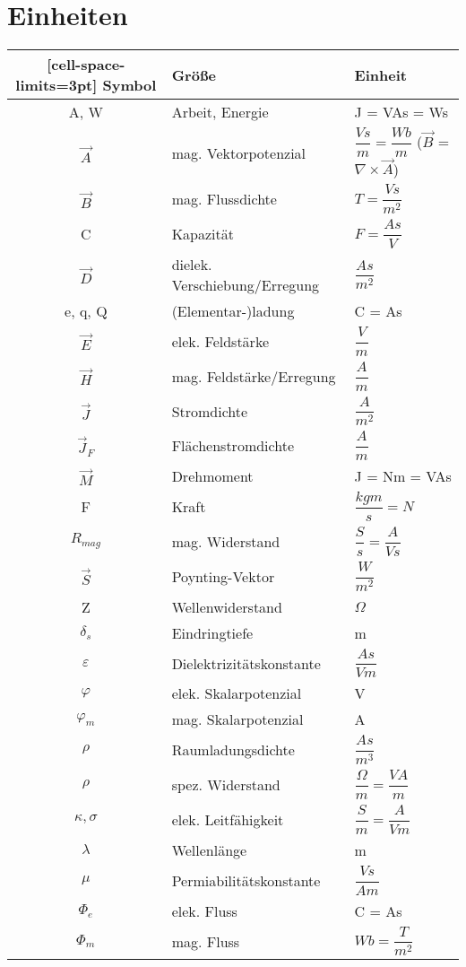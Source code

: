 \section{Einheiten}
\begin{NiceTabular}{c|l|l}[cell-space-limits=3pt]
    \hline
    Symbol & Größe & Einheit\\
    \hline 
    A, W & Arbeit, Energie & J = VAs = Ws\\
    $\vec{A}$ & mag. Vektorpotenzial & $\dfrac{Vs}{m} = \dfrac{Wb}{m}$ ($\vec{B}$ = $\nabla \times \vec{A}$)\\
    $\vec{B}$ & mag. Flussdichte & $T = \dfrac{Vs}{m^2}$\\
    C & Kapazität & $F = \dfrac{As}{V}$\\
    $\vec{D}$ & dielek. Verschiebung/Erregung & $\dfrac{As}{m^2}$\\
    e, q, Q & (Elementar-)ladung & C = As\\
    $\vec{E}$ & elek. Feldstärke & $\dfrac{V}{m}$ \\
    $\vec{H}$ & mag. Feldstärke/Erregung & $\dfrac{A}{m}$\\
    $\vec{J}$ & Stromdichte & $\dfrac{A}{m^2}$\\
    $\vec{J}_F$ & Flächenstromdichte & $\dfrac{A}{m}$\\
    $\vec{M}$ & Drehmoment & J = Nm = VAs\\
    F & Kraft & $\dfrac{kgm}{s} = N$\\
    $R_{mag}$ & mag. Widerstand & $\dfrac{S}{s} = \dfrac{A}{Vs}$\\
    $\vec{S}$ & Poynting-Vektor & $\dfrac{W}{m^2}$\\
    Z & Wellenwiderstand & $\Omega$\\
    $\delta_s$ & Eindringtiefe & m \\
    $\varepsilon$ & Dielektrizitätskonstante & $\dfrac{As}{Vm}$\\
    $\varphi$ & elek. Skalarpotenzial & V \\
    $\varphi_m$ & mag. Skalarpotenzial & A \\
    $\rho$ & Raumladungsdichte & $\dfrac{As}{m^3}$\\
    $\rho$ & spez. Widerstand & $\dfrac{\Omega}{m} = \dfrac{VA}{m}$\\
    $\kappa, \sigma$ & elek. Leitfähigkeit & $\dfrac{S}{m} = \dfrac{A}{Vm}$\\
    $\lambda$ & Wellenlänge & m\\
    $\mu$ & Permiabilitätskonstante & $\dfrac{Vs}{Am}$\\
    $\Phi_e$ & elek. Fluss & C = As\\
    $\Phi_m$ & mag. Fluss & $Wb = \dfrac{T}{m^2}$\\

    \hline
\end{NiceTabular}
    